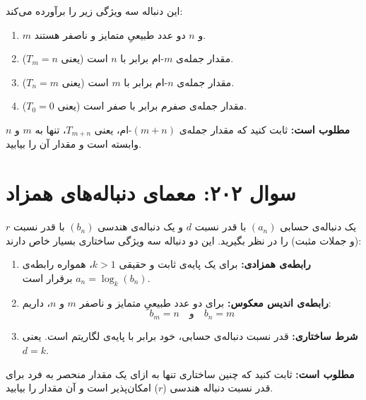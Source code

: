 \documentclass[12pt]{article}
\begin{document}
این دنباله سه ویژگی زیر را برآورده می‌کند:
\begin{enumerate}[label=(\roman*)]
	\item $m$ و $n$ دو عدد طبیعیِ متمایز و ناصفر هستند.
	\item مقدار جمله‌ی $m$-ام برابر با $n$ است (یعنی $T_m = n$).
	\item مقدار جمله‌ی $n$-ام برابر با $m$ است (یعنی $T_n = m$).
	\item مقدار جمله‌ی صفرم برابر با صفر است (یعنی $T_0 = 0$).
\end{enumerate}
\vspace{0.5cm}

\textbf{مطلوب است:}
ثابت کنید که مقدار جمله‌ی $(m+n)$-ام، یعنی $T_{m+n}$، تنها به $m$ و $n$ وابسته است و مقدار آن را بیابید.

\vspace{1cm}
\hrulefill
\vspace{1cm}


\section*{سوال ۲۰۲: معمای دنباله‌های همزاد}
یک دنباله‌ی حسابی $(a_n)$ با قدر نسبت $d$ و یک دنباله‌ی هندسی $(b_n)$ با قدر نسبت $r$ (و جملات مثبت) را در نظر بگیرید. این دو دنباله سه ویژگی ساختاری بسیار خاص دارند:
\vspace{0.5cm}

\begin{enumerate}[label=(\roman*)]
	\item \textbf{رابطه‌ی همزادی:} برای یک پایه‌ی ثابت و حقیقی $k > 1$، همواره رابطه‌ی $a_n = \log_k(b_n)$ برقرار است.
	
	\item \textbf{رابطه‌ی اندیس معکوس:} برای دو عدد طبیعیِ متمایز و ناصفر $m$ و $n$، داریم:
	\[ b_m = n \quad \text{و} \quad b_n = m \]
	
	\item \textbf{شرط ساختاری:} قدر نسبت دنباله‌ی حسابی، خود برابر با پایه‌ی لگاریتم است. یعنی $d = k$.
\end{enumerate}
\vspace{0.5cm}

\textbf{مطلوب است:}
ثابت کنید که چنین ساختاری تنها به ازای یک مقدار منحصر به فرد برای قدر نسبت دنباله هندسی ($r$) امکان‌پذیر است و آن مقدار را بیابید.
\end{document}
